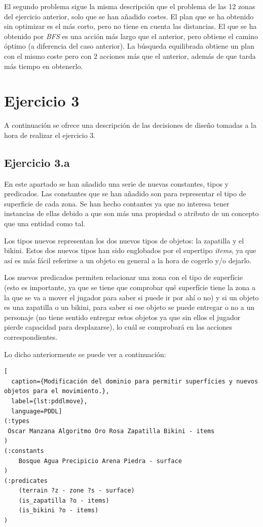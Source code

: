 \documentclass[11pt,a4paper]{article}
\begin{document}
El segundo problema sigue la misma descripción que el problema de las 12 zonas del ejercicio anterior, solo que se han añadido costes.
El plan que se ha obtenido sin optimizar es el más corto, pero no tiene en cuenta las distancias. El que se ha obtenido por
\textit{BFS} es una acción más largo que el anterior, pero obtiene el camino óptimo (a diferencia del caso anterior). La búsqueda
equilibrada obtiene un plan con el mismo coste pero con 2 acciones más que el anterior, además de que tarda más tiempo en obtenerlo.

\section{Ejercicio 3}

A continuación se ofrece una descripción de las decisiones de diseño tomadas a la hora de realizar el ejercicio 3.

\subsection{Ejercicio 3.a}

En este apartado se han añadido una serie de nuevas constantes, tipos y predicados. Las constantes que se han añadido son para
representar el tipo de superficie de cada zona. Se han hecho contantes ya que no interesa tener instancias de ellas debido a que son
más una propiedad o atributo de un concepto que una entidad como tal.

Los tipos nuevos representan los dos nuevos tipos de objetos: la zapatilla y el bikini. Estos dos nuevos tipos han sido
englobados por el supertipo \textit{items}, ya que así es más fácil referirse a un objeto en general a la hora de cogerlo y/o dejarlo.

Los nuevos predicados permiten relacionar una zona con el tipo de superfície (esto es importante, ya que se tiene que comprobar qué
superfície tiene la zona a la que se va a mover el jugador para saber si puede ir por ahí o no) y si un objeto es una zapatilla o
un bikini, para saber si ese objeto se puede entregar o no a un personaje (no tiene sentido entregar estos objetos ya que sin ellos
el jugador pierde capacidad para desplazarse), lo cuál se comprobará en las acciones correspondientes.

Lo dicho anteriormente se puede ver a continuación:

\begin{algorithm}[H]
\begin{lstlisting}[
  caption={Modificación del dominio para permitir superfícies y nuevos objetos para el movimiento.},
  label={lst:pddlmove},
  language=PDDL]
(:types
 Oscar Manzana Algoritmo Oro Rosa Zapatilla Bikini - items
)
(:constants
	Bosque Agua Precipicio Arena Piedra - surface
)
(:predicates
	(terrain ?z - zone ?s - surface)
	(is_zapatilla ?o - items)
	(is_bikini ?o - items)
)
\end{lstlisting}
\end{algorithm}
\end{document}

